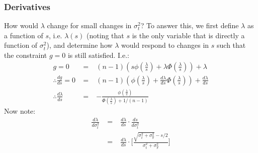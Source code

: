\documentclass[a4paper,10pt]{article}
\newcommand{\pdf}{\phi(\lambda)}
\newcommand{\pdff}{\phi(\tfrac{\lambda}{s})}
\newcommand{\cdf}{\Phi(\lambda)}
\newcommand{\cdff}{\Phi(\tfrac{\lambda}{s})}
\begin{document}
% 
% 

\subsubsection{Derivatives} \label{sec:derivatives-finite}

How would $\lambda$ change for small changes in $\sigma_t^2$?
To answer this, we first define $\lambda$ as a function of $s$, i.e. $\lambda(s)$
(noting that $s$ is the only variable that is directly a function of $\sigma_t^2$),
and determine how $\lambda$ would respond to changes in $s$ such that the constraint $g=0$
is still satisfied.
I.e.:
\begin{eqnarray}
 g =  0 &\;=\;& (n-1)(s\pdff +\lambda\cdff) + \lambda \\
 \therefore \frac{dg}{ds} = 0 &\;=\;& (n-1)(\pdff +\frac{d\lambda}{ds}\cdff) + \frac{d\lambda}{ds} \\
 \therefore \frac{d\lambda}{ds} &\;=\;& -\frac{\pdff}{\cdff+1/(n-1)}
\end{eqnarray}
Now note:
\begin{eqnarray}
 \frac{d\lambda}{d\sigma_t^2} &\;=\;& \frac{d\lambda}{ds} \cdot \frac{ds}{d\sigma_t^2} \\
  &\;=\;& \frac{d\lambda}{ds} \cdot \Big[ \frac{ \sqrt{\sigma_t^2+\sigma_y^2} - s/2}{\sigma_t^2+\sigma_y^2}\Big]
\end{eqnarray}
\end{document}
